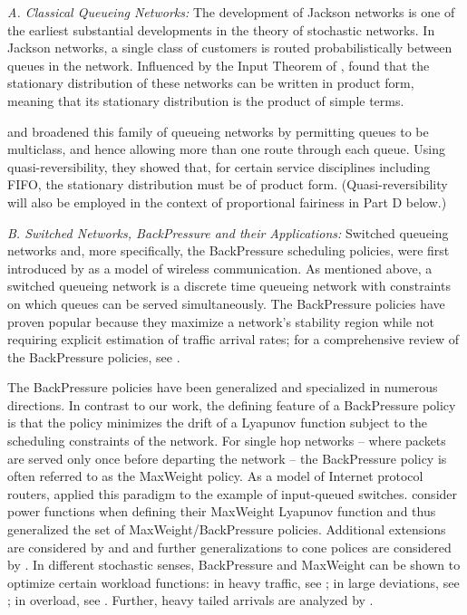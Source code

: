 \documentclass{amsart}
\begin{document}
\emph{A. Classical Queueing Networks:} The development of Jackson networks is one of the earliest substantial developments in the theory of stochastic networks.
In Jackson networks, a single class of customers is routed probabilistically between queues in the network.
Influenced by the Input Theorem of \cite{Bu56}, \cite{Ja63} found that the stationary distribution of these networks can be written in product form, meaning that its stationary distribution is the product of simple terms. 

\cite{BCMP75} and \cite{Ke75,Ke79} 
broadened this family of queueing networks by permitting queues to be multiclass, and hence allowing more than one route through each queue. 
Using quasi-reversibility, they showed that, for certain service disciplines including FIFO, the stationary distribution must be of product form.  (Quasi-reversibility will 
also be
employed in the context of proportional fairiness in Part D below.)

\emph{B. Switched Networks, BackPressure and their Applications:} Switched queueing networks and, more specifically, the BackPressure scheduling policies, were first introduced by \cite{TaEp92} as a model of wireless communication. As mentioned above, a switched queueing network is a discrete time queueing network with constraints on which queues can be served simultaneously.
The BackPressure policies have proven popular because they maximize a network's stability region while not requiring explicit estimation of traffic arrival rates;
for a comprehensive review of the BackPressure policies, see \cite{GNT06}.

The BackPressure policies have been generalized and specialized in numerous directions. 
In contrast to our work, the defining feature of a BackPressure policy is that the policy minimizes the drift of a Lyapunov function subject to the scheduling constraints of the network. For single hop networks -- where packets are served only once before departing the network -- the BackPressure policy is often referred to as the MaxWeight policy.
As a model of Internet protocol routers, \cite{MMAW99} applied this paradigm to the example of input-queued switches.
 \cite{AKRSVW04} consider power functions when defining their MaxWeight Lyapunov function and thus generalized the set of MaxWeight/BackPressure policies.
Additional extensions are considered by \cite{Me09} and \cite{ESP05} and further generalizations to cone polices are considered by \cite{ArBa03}.
In different stochastic senses, BackPressure and MaxWeight can be shown to optimize certain workload functions:
 in heavy traffic, see \cite{St04}; in large deviations, see \cite{Ve07}; in overload, see \cite{ShWi11}. Further, heavy tailed arrivals are analyzed by \cite{JMMT11}.
   
\end{document}
